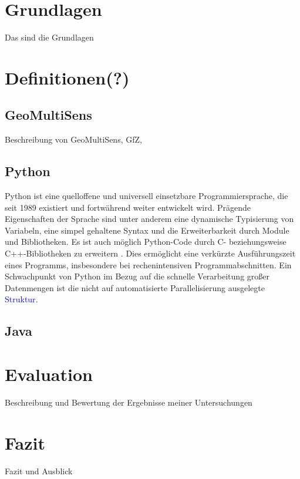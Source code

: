 \chapter{Grundlagen}
Das sind die Grundlagen

\chapter{Definitionen(?)}

\section{GeoMultiSens}
Beschreibung von GeoMultiSens, GfZ, 

\section{Python}
Python ist eine quelloffene und universell einsetzbare Programmiersprache, die seit 1989 existiert und fortwährend weiter entwickelt wird. Prägende Eigenschaften der Sprache sind unter anderem eine dynamische Typisierung von Variabeln, eine simpel gehaltene Syntax und die Erweiterbarkeit durch Module und Bibliotheken. Es ist auch möglich Python-Code durch C- beziehungsweise C++-Bibliotheken zu erweitern \cite{Martelli2006}. Dies ermöglicht eine verkürzte Ausführungszeit eines Programms, insbesondere bei rechenintensiven Programmabschnitten. Ein Schwachpunkt von Python im Bezug auf die schnelle Verarbeitung großer Datenmengen ist die nicht auf automatisierte Parallelisierung ausgelegte \textcolor{blue}{Struktur}.

\section{Java}

\chapter{Evaluation}
Beschreibung und Bewertung der Ergebnisse meiner Untersuchungen

\chapter{Fazit}
Fazit und Ausblick

